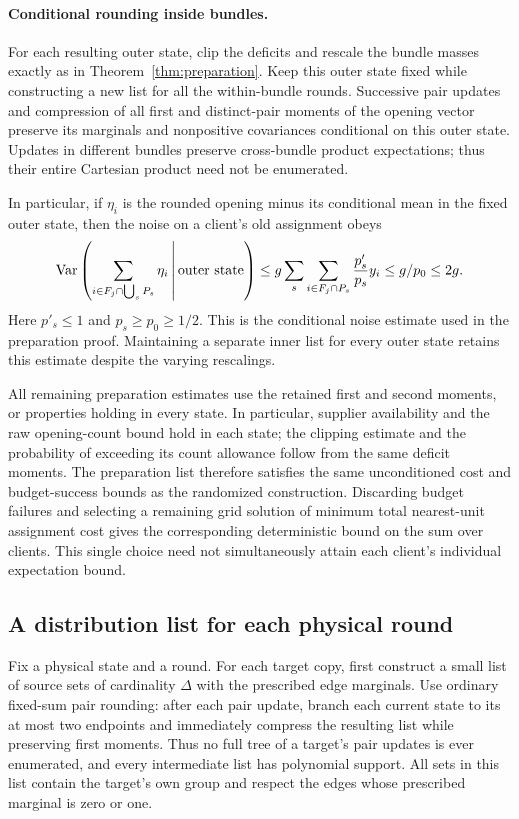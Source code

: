 \paragraph{Conditional rounding inside bundles.}
For each resulting outer state, clip the deficits and rescale the
bundle masses exactly as in Theorem~\ref{thm:preparation}. Keep this
outer state fixed while constructing a new list for all the
within-bundle rounds. Successive pair updates and compression of all
first and distinct-pair moments of the opening vector preserve its
marginals and nonpositive covariances conditional on this outer
state. Updates in different bundles preserve cross-bundle product
expectations; thus their entire Cartesian product need not be
enumerated.

In particular, if \(\eta_i\) is the rounded opening minus its
conditional mean in the fixed outer state, then the noise on a
client's old assignment obeys
\[
 \operatorname{Var}\left(
   \sum_{i\in F_j\cap\bigcup_sP_s}\eta_i
   \,\middle|\,\text{outer state}
 \right)
 \le
 g\sum_s\sum_{i\in F_j\cap P_s}\frac{p'_s}{p_s}y_i
 \le g/p_0\le 2g.
\]
Here \(p'_s\le1\) and \(p_s\ge p_0\ge1/2\). This is the conditional
noise estimate used in the preparation proof. Maintaining a separate
inner list for every outer state retains this estimate despite
the varying rescalings.

All remaining preparation estimates use the retained first and second
moments, or properties holding in every state. In particular, supplier
availability and the raw opening-count bound hold in each state;
the clipping estimate and the probability of exceeding its count
allowance follow from the same deficit moments. The preparation list
therefore satisfies the same unconditioned cost and budget-success
bounds as the randomized construction. Discarding budget failures
and selecting a remaining grid solution of minimum total nearest-unit
assignment cost gives the corresponding deterministic bound on the
sum over clients. This single choice need not simultaneously attain
each client's individual expectation bound.

\subsection{A distribution list for each physical round}

Fix a physical state and a round. For each target copy, first construct
a small list of source sets of cardinality \(\Delta\) with the
prescribed edge marginals. Use ordinary fixed-sum pair rounding:
after each pair update, branch each current state to its at most two
endpoints and immediately compress the resulting list while preserving
first moments. Thus no full tree of a target's pair updates is ever
enumerated, and every intermediate list has polynomial support.
All sets in this list
contain the target's own group and respect the edges whose prescribed
marginal is zero or one.

